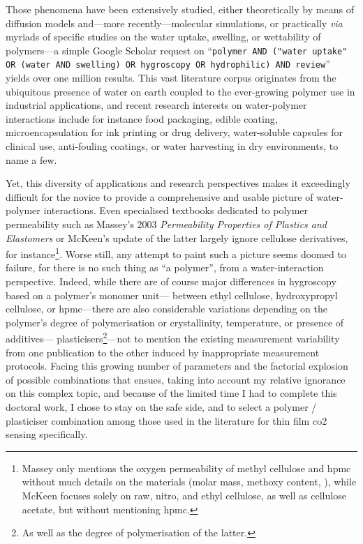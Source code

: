 Those phenomena have been extensively studied, either theoretically by means of diffusion models\cite{vanderwel1999, chapter4_solubility} and---more recently---molecular simulations\cite{kulasinski2015, kulasinski2016}, or practically \textit{via} myriads of specific studies on the water uptake, swelling, or wettability of polymers---a simple Google Scholar request on \enquote{\texttt{polymer AND ("water uptake" OR (water AND swelling) OR hygro\-scopy OR hydrophilic) AND review}} yields over one million results. This vast literature corpus originates from the ubiquitous presence of water on earth coupled to the ever-growing polymer use in industrial applications\cite[Fig. S1]{geyer2017}, and recent research interests on water-polymer interactions include for instance food packaging\cite{asim2022}, edible coating\cite{mishra2010}, microencapsulation for ink printing or drug delivery\cite{rogers2012}, water-soluble capsules for clinical use\cite{yang2020capsule}, anti-fouling coatings\cite{rana2010}, or water harvesting in dry environments\cite{guo2022}, to name a few.

Yet, this diversity of applications and research perspectives makes it exceedingly difficult for the novice to provide a comprehensive and usable picture of water-polymer interactions. Even specialised textbooks dedicated to polymer permeability such as Massey's 2003 \textit{Permeability Properties of Plastics and Elastomers}\cite{massey2003} or McKeen's update of the latter\cite{mckeen2017} largely ignore cellulose derivatives, for instance\footnote{Massey only mentions the oxygen permeability of methyl cellulose and \gls{hpmc} without much details on the materials (molar mass, methoxy content, \etc{}), while McKeen focuses solely on raw, nitro, and ethyl cellulose, as well as cellulose acetate, but without mentioning \gls{hpmc}.}. Worse still, any attempt to paint such a picture seems doomed to failure, for there is no such thing as \enquote{a polymer}, from a water-interaction perspective. Indeed, while there are of course major differences in hygroscopy based on a polymer's monomer unit---\eg{} between ethyl cellulose, hydroxypropyl cellulose, or \gls{hpmc}\cite{patel2022_part2}---there are also considerable variations depending on the polymer's degree of polymerisation\cite{patel2022_part1, thijs2007} or crystallinity\cite{hatakeyama1998}, temperature\cite{patel2022_part1, patel2022_part2, patel2023_part3}, or presence of additives\cite{mishra2010, khwaldia2013, mahadevaiah2017}---\eg{} plasticisers\footnote{As well as the degree of polymerisation of the latter\cite{aydinli2000}.}---not to mention the existing measurement variability from one publication to the other induced by inappropriate measurement protocols\cite{valenzuela2011}. Facing this growing number of parameters and the factorial explosion of possible combinations that ensues, taking into account my relative ignorance on this complex topic, and because of the limited time I had to complete this doctoral work, I chose to stay on the safe side, and to select a polymer / plasticiser combination among those used in the literature for thin film \gls{co2} sensing specifically.

